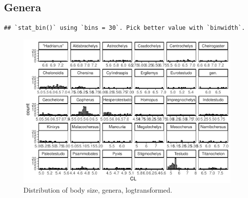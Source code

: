 \documentclass[]{article}
\begin{document}
\newpage

\subsection{Genera}\label{genera}

\begin{verbatim}
## `stat_bin()` using `bins = 30`. Pick better value with `binwidth`.
\end{verbatim}

\begin{figure}[htbp]
\centering
\includegraphics{MA_JJ_files/figure-latex/Histograms of body size data, genera-1.pdf}
\caption{Distribution of body size, genera, logtransformed.}
\end{figure}
\end{document}
